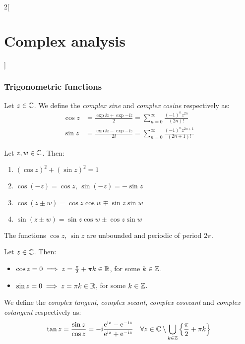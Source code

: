 \documentclass[../../../main.tex]{subfiles}
\begin{document}
\begin{multicols}{2}[\section{Complex analysis}]
  \subsubsection{Trigonometric functions}
  \begin{definition}
    Let $z\in \mathbb{C}$. We define the \emph{complex sine} and \emph{complex cosine} respectively as:
    \begin{align*}
      \cos z & =\frac{\exp{\ii z}+\exp{-\ii z}}{2}=\sum_{n=0}^\infty\frac{(-1)^nz^{2n}}{(2n)!}        \\
      \sin z & =\frac{\exp{\ii z}-\exp{-\ii z}}{2\ii}=\sum_{n=0}^\infty\frac{(-1)^nz^{2n+1}}{(2n+1)!}
    \end{align*}
  \end{definition}
  \begin{proposition}
    Let $z,w\in\mathbb{C}$. Then:
    \begin{enumerate}
      \item ${\left(\cos z\right)}^2+{\left(\sin z\right)}^2=1$
      \item $\cos(-z)=\cos z$, $\sin(-z)=-\sin z$
      \item $\cos(z \pm w) = \cos z \cos w \mp \sin z \sin w$
      \item $\sin(z \pm w) = \sin z \cos w \pm \cos z \sin w$
    \end{enumerate}
  \end{proposition}
  \begin{proposition}
    The functions $\cos z$, $\sin z$ are unbounded and periodic of period $2\pi$.
  \end{proposition}
  \begin{proposition}
    Let $z\in \mathbb{C}$. Then:
    \begin{itemize}
      \item $\cos z=0\implies z=\frac{\pi}{2}+\pi k\in\mathbb{R}$, for some $k\in\mathbb{Z}$.
      \item $\sin z=0\implies z=\pi k\in\mathbb{R}$, for some $k\in\mathbb{Z}$.
    \end{itemize}
  \end{proposition}
  \begin{definition}
    We define the \emph{complex tangent}, \emph{complex secant}, \emph{complex cosecant} and \emph{complex cotangent} respectively as:
    \begin{align*}
      \tan z & = \frac{\sin z}{\cos z}=-\ii\frac{\exp{\ii z}-\exp{-\ii z}}{\exp{\ii z}+\exp{-\ii z}}\quad \forall z\in\CC\setminus\bigcup_{k\in\ZZ}\left\{\frac{\pi}{2}+\pi k\right\} \\

\end{align*}
\end{definition}
\end{multicols}
\end{document}
